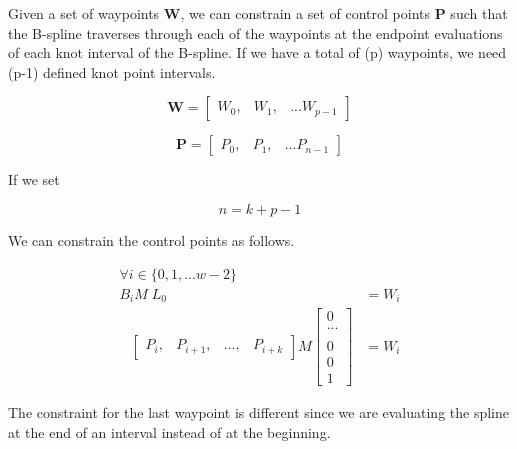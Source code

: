 \documentclass{article}
\begin{document}
    Given a set of waypoints \(\textbf{W}\), we can constrain a set of control points \(\textbf{P}\) such that the B-spline traverses through each of the waypoints at the endpoint evaluations of each knot interval of the B-spline. If we have a total of (p) waypoints, we need (p-1) defined knot point intervals.
    
    \begin{equation}
        \textbf{W} = \begin{bmatrix}
            W_0, &  W_1, & ... W_{p-1}
        \end{bmatrix}
    \end{equation}
    
    \begin{equation}
        \textbf{P} = \begin{bmatrix}
                P_0, &  P_1, & ... P_{n-1}
        \end{bmatrix}
    \end{equation}
    
   If we set 
    
    \begin{equation}
        n = k+p-1
    \end{equation}
    
We can constrain the control points as follows.

\begin{equation}
\begin{aligned}
    \forall i \in \{0 , 1 , ... w-2\} \qquad \qquad \qquad & \\
    B_i M \; L_0 & = W_i \\
    \begin{matrix} \end{matrix} \begin{bmatrix} P_i, & P_{i+1}, & ..., & P_{i+k} \end{bmatrix} M \begin{bmatrix} 0 \\ ... \\\\ 0 \\ 0 \\ 1 \end{bmatrix} & = W_i 
\end{aligned}
\end{equation}

The constraint for the last waypoint is different since we are evaluating the spline at the end of an interval instead of at the beginning.
\end{document}
